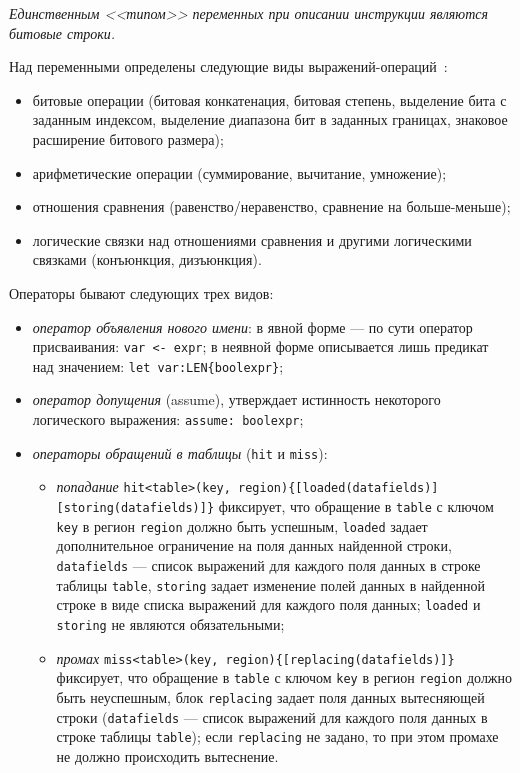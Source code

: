 \emph{Единственным <<типом>> переменных при описании инструкции являются битовые
строки.}

Над переменными определены следующие виды выражений-операций~\cite{my_syrcose_2008, my_isp_2008}:
\begin{itemize}
    \item битовые операции (битовая конкатенация, битовая степень, выделение
бита с заданным индексом, выделение диапазона бит в заданных границах, знаковое
расширение битового размера);
    \item арифметические операции (суммирование, вычитание, умножение);
    \item отношения сравнения (равенство/неравенство, сравнение на
больше-меньше);
    \item логические связки над отношениями сравнения и другими логическими
связками (конъюнкция, дизъюнкция).
\end{itemize}

Операторы бывают следующих трех видов:
\begin{itemize}
    \item \emph{оператор объявления нового имени}: в явной форме --- по сути
оператор присваивания: \texttt{var <- expr}; в неявной форме описывается лишь
предикат над значением: \texttt{let var:LEN\{boolexpr\}};
    \item \emph{оператор допущения} (assume), утверждает истинность некоторого
логического выражения: \texttt{assume: boolexpr};
    \item \emph{операторы обращений в таблицы} (\texttt{hit} и \texttt{miss}):
        \begin{itemize}
            \item \emph{попадание} \texttt{hit<table>(key,
region)\{[loaded(datafields)]}\\\texttt{[storing(datafields)]\}} фиксирует, что
обращение в \texttt{table} с ключом \texttt{key} в регион \texttt{region} должно
быть успешным, \texttt{loaded} задает дополнительное ограничение на поля данных найденной строки, \\ \texttt{datafields} --- список выражений для каждого поля данных в строке таблицы \texttt{table}, \texttt{storing} задает изменение полей данных в
найденной строке в виде списка выражений для каждого поля данных; \texttt{loaded} и \texttt{storing} не являются обязательными;
            \item \emph{промах} \texttt{miss<table>(key,
region)\{[replacing(datafields)]\}}\\фиксирует, что обращение в \texttt{table} с
ключом \texttt{key} в регион \texttt{region} должно быть неуспешным, блок
\texttt{replacing} задает поля данных вытесняющей строки (\texttt{datafields}
--- список выражений для каждого поля данных в строке таблицы \texttt{table});
если \texttt{replacing} не задано, то при этом промахе не должно происходить
вытеснение.
        \end{itemize}
\end{itemize}



